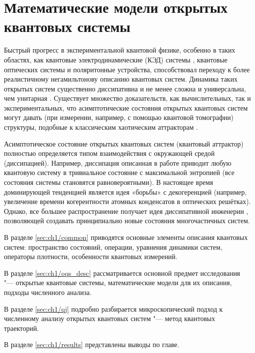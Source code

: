 \chapter{Математические модели открытых квантовых системы}\label{ch:ch1}

Быстрый прогресс в экспериментальной квантовой физике, особенно в таких областях, как квантовые электродинамические (КЭД) системы \cite{Walther2006}, квантовые оптических системы \cite{Aspelmeyer2014} и поляритонные устройства\cite{Feurer2003}, способствовал переходу к более реалистичному негамильтонову описанию квантовых систем. 
Динамика таких открытых систем существенно диссипативна и не менее сложна и универсальна, чем унитарная \cite{Diehl2008, Budich2015}. 
Существует множество доказательств, как вычислительных, так и экспериментальных, что асимптотические состояния открытых квантовых систем могут давать (при измерении, например, с помощью квантовой томографии) структуры, подобные к классическим хаотическим аттракторам \cite{Spiller1994, Brun1996, Hartmann2017, Ivanchenko2017, Carlo2017, Wang2018}. 

Асимптотическое состояние открытых квантовых систем (квантовый аттрактор) полностью определяется типом взаимодействия с окружающей средой (диссипацией). 
Например, диссипация описанная в работе \autocite{Poletti2013} приводит любую квантовую систему в тривиальное состояние с максимальной энтропией (все состояния системы становятся равновероятными).
В настоящее время доминирующей тенденцией является идея «борьбы» с декогеренцией (например, увеличение времени когерентности атомных конденсатов в оптических решётках). Однако, все большее распространение получает идея диссипативной инженерии \autocite{Diehl2008}, позволяющей создавать принципиально новые состояния многочастичных систем.

В разделе \cref{sec:ch1/common} приводятся основные элементы описания квантовых систем: пространство состояний, операции, уравнения динамики систем, операторы плотности, особенности квантовых измерений.

В разделе \cref{sec:ch1/oqs_desc} рассматривается основной предмет исследования "--- открытые квантовые системы, математические модели для их описания, подходы численного анализа.
 
В разделе \cref{sec:ch1/qj} подробно разбирается микроскопический подход к численному анализу открытых квантовых систем "--- метод квантовых траекторий.

В разделе \cref{sec:ch1/results} представлены выводы по главе.

